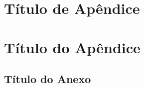 \documentclass[	12pt, Times, openright, twoside, a4paper, english, brazil]{abntex2}
\begin{document}
%
%


\begin{apendicesenv}

\partapendices

\chapter{Título de Apêndice}


\chapter{Título do Apêndice}


\end{apendicesenv}



\begin{anexosenv}

\partanexos

\chapter{Título do Anexo}

\end{anexosenv}
\end{document}
